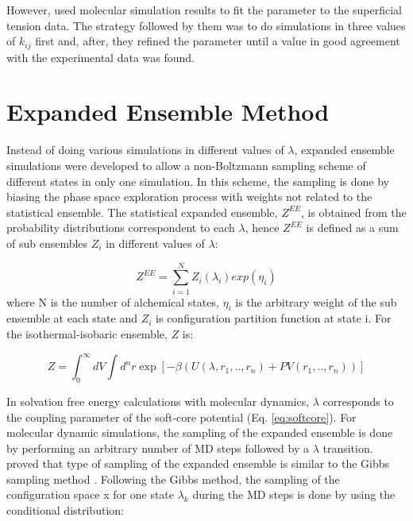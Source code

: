 However,  used molecular simulation results to fit the parameter to the superficial tension data. The strategy followed by them was to do simulations in three values of $k_{ij}$ first and, after, they refined the parameter until a value in good agreement with the experimental data was found. 


\section{Expanded Ensemble Method}\label{ee}
Instead of doing various simulations in different values of $\lambda$, expanded ensemble simulations \cite{lyubartsev} were developed to allow a non-Boltzmann sampling scheme of different states in only one simulation. In this scheme, the sampling is done by biasing the phase space exploration process with weights not related to the statistical ensemble. The statistical expanded ensemble, $Z^{EE}$, is obtained from the probability distributions correspondent to each $\lambda$, hence $Z^{EE}$ is defined as a sum of sub ensembles $Z_{i}$ in different values of $\lambda$:

\begin{equation}
Z^{EE} = \sum_{i=1}^{N} Z_{i}(\lambda_{i}) exp(\eta_{i})
\label{eqn:ee}
\end{equation}   
where N is the number of alchemical states, $\eta_{i}$ is the arbitrary weight of the sub ensemble at each state and $Z_{i}$ is configuration partition function at state i. For the isothermal-isobaric ensemble, $Z$ is:

\begin{equation}
Z = {\int_{0}^{\infty} dV \int d^{n}r \exp \left[ -\beta \left(U(\lambda, r_{1},..,r_{n}) + PV(r_{1},..,r_{n}) \right) \right]}
\end{equation} 

In solvation free energy calculations with molecular dynamics, $\lambda$ corresponds to the coupling parameter of the soft-core potential (Eq. \ref{eq:softcore}). For molecular dynamic simulations, the sampling of the expanded ensemble is done by performing an arbitrary number of MD  steps followed by a $\lambda$ transition.  proved that type of sampling of the expanded ensemble is similar to the Gibbs sampling method \cite{geman1984,liu2002}. Following the Gibbs method, the sampling of the configuration space x for one state $\lambda_{k}$ during the MD steps is done by using the conditional distribution:

